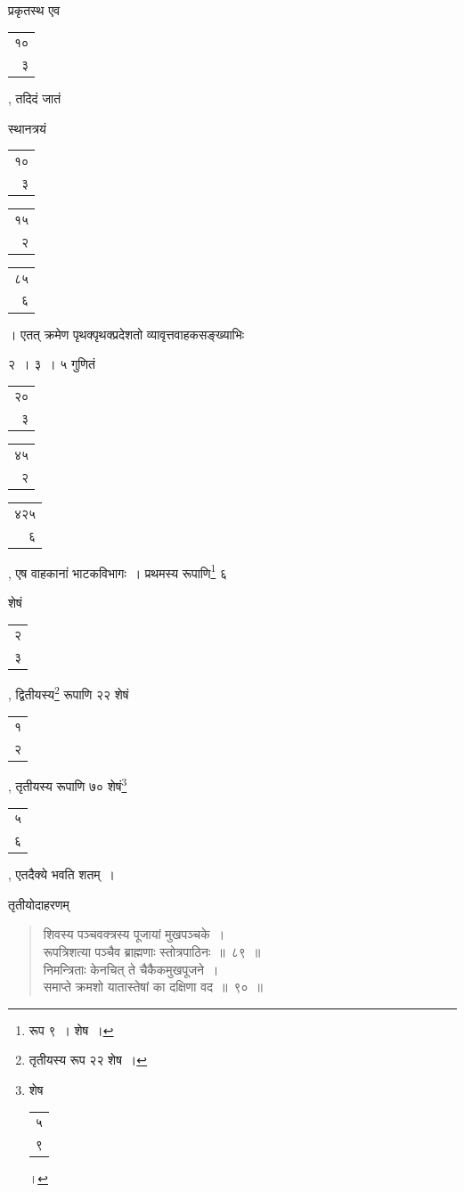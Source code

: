\documentclass[10pt, openany]{book}
\begin{document}
{{{प्रकृतस्थ एव\begin{tabular}{r}१०\\ ३\end{tabular}, तदिदं जातं}
{स्थानत्रयं\begin{tabular}{r|}१०\\ ३\end{tabular}\begin{tabular}{r|}१५\\ २\end{tabular}\begin{tabular}{r} ८५\\ ६\end{tabular}। एतत् क्रमेण पृथक्पृथक्प्रदेशतो
व्यावृत्तवाहकसङ्ख्याभिः}
{२~। ३~। ५ गुणितं\begin{tabular}{r|}२०\\ ३\end{tabular}\begin{tabular}{r|}४५\\ २\end{tabular}\begin{tabular}{r}४२५\\ ६\end{tabular}, एष वाहकानां भाटकविभागः~। प्रथमस्य
रूपाणि\renewcommand{\thefootnote}{\s ३}\footnote{\s रूप ९~। शेष~।} ६}
{शेषं\begin{tabular}{r}२\\ ३\end{tabular}, द्वितीयस्य\renewcommand{\thefootnote}{\s ४}\footnote{\s तृतीयस्य रूप २२ शेष~।} रूपाणि २२ शेषं\begin{tabular}{r}१ \\२\end{tabular}, तृतीयस्य रूपाणि ७०
शेषं\renewcommand{\thefootnote}{\s ५}\footnote{\s शेष\begin{tabular}{r}५\\ ९\end{tabular}।}\begin{tabular}{r}५\\ ६\end{tabular}, एतदैक्ये भवति शतम्~।}
\vspace{3mm}

{तृतीयोदाहरणम्\textemdash}

\begin{quote}
    
{\eg शिवस्य पञ्चवक्त्रस्य पूजायां मुखपञ्चके~। \\
 रूपत्रिशत्या पञ्चैव ब्राह्मणाः स्तोत्रपाठिनः~॥~८९~॥\\ 
 निमन्त्रिताः केनचित् ते चैकैकमुखपूजने~। \\
 समाप्ते क्रमशो यातास्तेषां का दक्षिणा वद~॥~९०~॥}\end{quote}

}}
\end{document}
